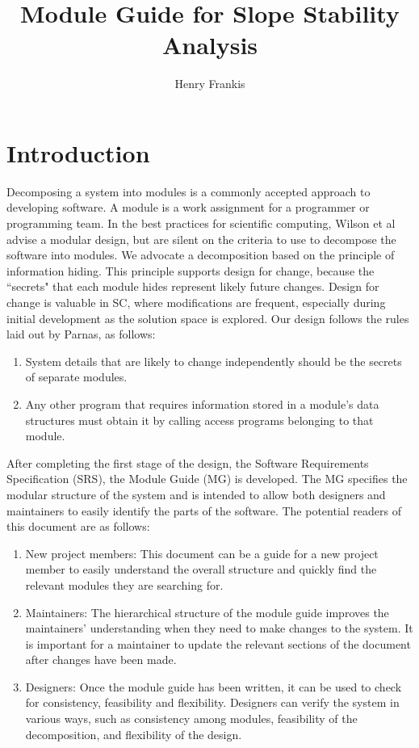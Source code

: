 \documentclass[12pt]{article}
\title{Module Guide for Slope Stability Analysis}
\author{Henry Frankis}
\begin{document}
\maketitle
\tableofcontents
\newpage
\section{Introduction}
\label{Sec:I}
Decomposing a system into modules is a commonly accepted approach to developing software.  A module is a work assignment for a programmer or programming team. In the best practices for scientific computing, Wilson et al advise a modular design, but are silent on the criteria to use to decompose the software into modules.  We advocate a decomposition based on the principle of information hiding. This principle supports design for change, because the ``secrets" that each module hides represent likely future changes.  Design for change is valuable in SC, where modifications are frequent, especially during initial development as the solution space is explored.
Our design follows the rules laid out by Parnas, as follows:
\begin{enumerate}
\item{System details that are likely to change independently should be the secrets of separate modules.}
\item{Any other program that requires information stored in a module's data structures must obtain it by calling access programs belonging to that module.}
\end{enumerate}
After completing the first stage of the design, the Software Requirements Specification (SRS), the Module Guide (MG) is developed. The MG specifies the modular structure of the system and is intended to allow both designers and maintainers to easily identify the parts of the software.  The potential readers of this document are as follows:
\begin{enumerate}
\item{New project members: This document can be a guide for a new project member to easily understand the overall structure and quickly find the relevant modules they are searching for.}
\item{Maintainers: The hierarchical structure of the module guide improves the maintainers' understanding when they need to make changes to the system. It is important for a maintainer to update the relevant sections of the document after changes have been made.}
\item{Designers: Once the module guide has been written, it can be used to check for consistency, feasibility and flexibility. Designers can verify the system in various ways, such as consistency among modules, feasibility of the decomposition, and flexibility of the design.}
\end{enumerate}
\end{document}
